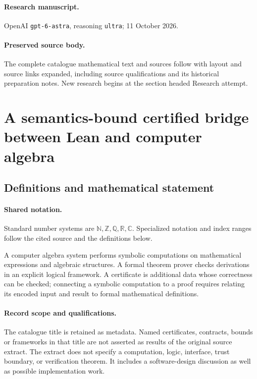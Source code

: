 \documentclass[11pt]{article}
\begin{document}
\paragraph{Research manuscript.} OpenAI \texttt{gpt-6-astra}, reasoning \texttt{ultra}; 11 October 2026.
\paragraph{Preserved source body.} The complete catalogue mathematical text and sources follow with layout and source links expanded, including source qualifications and its historical preparation notes. New research begins at the section headed Research attempt.

\section{A semantics-bound certified bridge between Lean and computer algebra}\label{statement}

\subsection{Definitions and mathematical statement}

\paragraph{Shared notation.}Standard number systems are $\mathbb N,\mathbb Z,\mathbb Q,\mathbb R,\mathbb C$. Specialized notation and index ranges follow the cited source and the definitions below.


A computer algebra system performs symbolic computations on mathematical expressions and algebraic structures. A formal theorem prover checks derivations in an explicit logical framework. A certificate is additional data whose correctness can be checked; connecting a symbolic computation to a proof requires relating its encoded input and result to formal mathematical definitions.
\paragraph{Record scope and qualifications.}
The catalogue title is retained as metadata. Named certificates, contracts, bounds or frameworks in that title are not asserted as results of the original source extract.
The extract does not specify a computation, logic, interface, trust boundary, or verification theorem. It includes a software-design discussion as well as possible implementation work.
\end{document}
